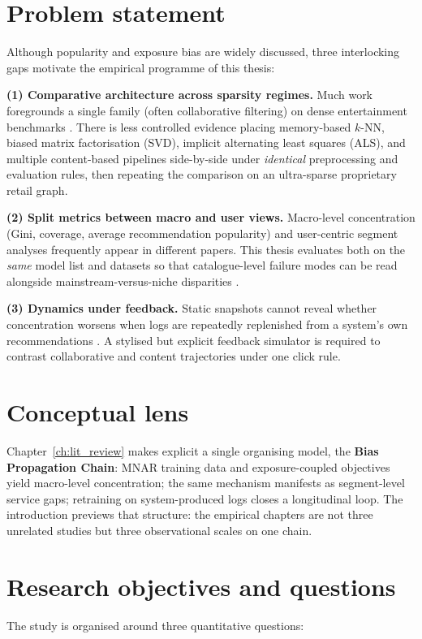 \section{Problem statement}
Although popularity and exposure bias are widely discussed, three interlocking gaps motivate the empirical programme of this thesis:

\textbf{(1) Comparative architecture across sparsity regimes.} Much work foregrounds a single family (often collaborative filtering) on dense entertainment benchmarks \citep{klimashevskaia2024survey}. There is less controlled evidence placing memory-based $k$-NN, biased matrix factorisation (SVD), implicit alternating least squares (ALS), and multiple content-based pipelines side-by-side under \emph{identical} preprocessing and evaluation rules, then repeating the comparison on an ultra-sparse proprietary retail graph.

\textbf{(2) Split metrics between macro and user views.} Macro-level concentration (Gini, coverage, average recommendation popularity) and user-centric segment analyses frequently appear in different papers. This thesis evaluates both on the \emph{same} model list and datasets so that catalogue-level failure modes can be read alongside mainstream-versus-niche disparities \citep{abdollahpouri2019unfairness, leonhardt2018userfairness}.

\textbf{(3) Dynamics under feedback.} Static snapshots cannot reveal whether concentration worsens when logs are repeatedly replenished from a system's own recommendations \citep{chaney2018algorithmic, mansoury2020feedback}. A stylised but explicit feedback simulator is required to contrast collaborative and content trajectories under one click rule.

\section{Conceptual lens}
Chapter~\ref{ch:lit_review} makes explicit a single organising model, the \textbf{Bias Propagation Chain}: MNAR training data and exposure-coupled objectives yield macro-level concentration; the same mechanism manifests as segment-level service gaps; retraining on system-produced logs closes a longitudinal loop. The introduction previews that structure: the empirical chapters are not three unrelated studies but three observational scales on one chain.

\section{Research objectives and questions}
The study is organised around three quantitative questions:

